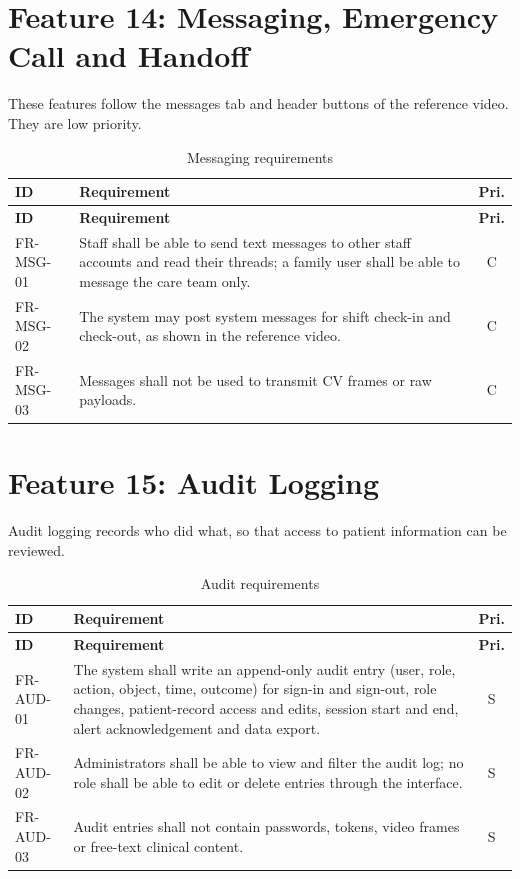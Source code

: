 \documentclass[a4paper,11pt]{scrreprt}
\makeatletter
\newenvironment{reqtable}[1]{%
  \small
  \begin{longtable}{@{}>{\ttfamily\footnotesize}p{2.55cm}>{\raggedright\arraybackslash}p{10.7cm}c@{}}
  \caption{#1}\\
  \toprule \textbf{ID} & \textbf{Requirement} & \textbf{Pri.}\\ \midrule
  \endfirsthead
  \toprule \textbf{ID} & \textbf{Requirement} & \textbf{Pri.}\\ \midrule
  \endhead
  \bottomrule
  \endfoot
}{%
  \end{longtable}\normalsize
}
\newcommand{\req}[3]{#1 & #2 & #3 \\ \midrule}
\makeatother
\begin{document}
\section{Feature 14: Messaging, Emergency Call and Handoff}
These features follow the messages tab and header buttons of the reference video. They are low priority.
\begin{reqtable}{Messaging requirements}
\req{FR-MSG-01}{Staff shall be able to send text messages to other staff accounts and read their threads; a family user shall be able to message the care team only.}{C}
\req{FR-MSG-02}{The system may post system messages for shift check-in and check-out, as shown in the reference video.}{C}
\req{FR-MSG-03}{Messages shall not be used to transmit CV frames or raw payloads.}{C}
\end{reqtable}

\section{Feature 15: Audit Logging}
Audit logging records who did what, so that access to patient information can be reviewed.
\begin{reqtable}{Audit requirements}
\req{FR-AUD-01}{The system shall write an append-only audit entry (user, role, action, object, time, outcome) for sign-in and sign-out, role changes, patient-record access and edits, session start and end, alert acknowledgement and data export.}{S}
\req{FR-AUD-02}{Administrators shall be able to view and filter the audit log; no role shall be able to edit or delete entries through the interface.}{S}
\req{FR-AUD-03}{Audit entries shall not contain passwords, tokens, video frames or free-text clinical content.}{S}
\end{reqtable}
\end{document}
